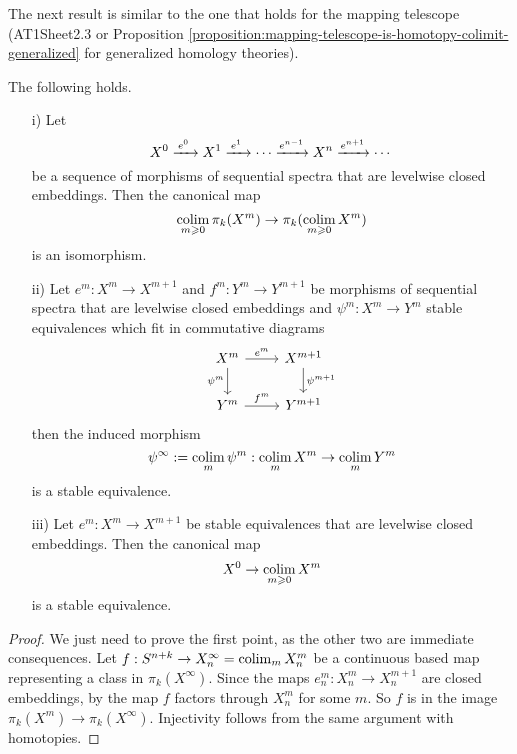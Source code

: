 

\noindent
The next result is similar to the one that holds for the mapping telescope (AT1Sheet2.3 or Proposition \ref{proposition:mapping-telescope-is-homotopy-colimit-generalized} for generalized homology theories).

\begin{proposition}
The following holds.
\begin{itemize}
    \item[i)] Let
    \[X^0\xto{\,e^0\ }X^1\xto{\,e^1\ }\cdots\xto{e^{n-1}}X^n\xto{e^{n+1}}\cdots\]
    be a sequence of morphisms of sequential spectra that are levelwise closed embeddings. Then the canonical map
    \[\operatorname*{colim}_{m\geqslant0}\pi_k(X^m)\to\pi_k(\operatorname*{colim}_{m\geqslant0}X^m)\]
    is an isomorphism.
    \item[ii)] Let $e^m:X^m\to X^{m+1}$ and $f^m:Y^m\to Y^{m+1}$ be morphisms of sequential spectra that are levelwise closed embeddings and $\psi^m: X^m\to Y^m$ stable equivalences which fit in commutative diagrams
    \[
    \begin{tikzcd}
    X^m \ar[d,"\psi^m"'] \ar[r,"e^m"] & X^{m+1} \ar[d,"\psi^{m+1}"]\\
    Y^m \ar[r,"f^m"] & Y^{m+1}
    \end{tikzcd}
    \]
    then the induced morphism
    \[\psi^\infty:=\operatorname*{colim}_m\psi^m:\operatorname*{colim}_m X^m\to\operatorname*{colim}_m Y^m\]
    is a stable equivalence.
    \item[iii)] Let $e^m:X^m\to X^{m+1}$ be stable equivalences that are levelwise closed embeddings. Then the canonical map \[X^0\to\operatorname*{colim}_{m\geqslant0}X^m\]
    is a stable equivalence. 
\end{itemize}
\end{proposition}

\begin{proof}
We just need to prove the first point, as the other two are immediate consequences. Let $f:S^{n+k}\to X^\infty_n=\operatorname*{colim}_m X^m_n$ be a continuous based map representing a class in $\pi_k(X^\infty)$. Since the maps $e^m_n:X^m_n\to X_n^{m+1}$ are closed embeddings, by \cite[Proposition A.15]{schwede} the map $f$ factors through $X^m_n$ for some $m$. So $f$ is in the image $\pi_k(X^m)\to\pi_k(X^\infty)$. Injectivity follows from the same argument with homotopies.
\end{proof}

